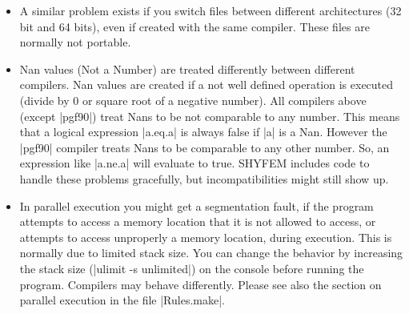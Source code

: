 \begin{itemize}
\item A similar problem exists if you switch files between different
architectures (32 bit and 64 bits), even if created with the same
compiler. These files are normally not portable.

\item Nan values (Not a Number) are treated differently between different
compilers. Nan values are created if a not well defined operation is
executed (divide by 0 or square root of a negative number). All compilers
above (except |pgf90|) treat Nans to be not comparable to any number.
This means that a logical expression |a.eq.a| is always false if |a|
is a Nan. However the |pgf90| compiler treats Nans to be comparable
to any other number. So, an expression like |a.ne.a| will evaluate to
true. SHYFEM includes code to handle these problems gracefully, but
incompatibilities might still show up.

\item In parallel execution you might get a segmentation fault, 
if the program attempts to access a memory location that it is not allowed to access, 
or attempts to access unproperly a memory location, during
execution. This is normally due to limited stack size. You can change
the behavior by increasing the stack size (|ulimit -s unlimited|)
on the console before running the program. Compilers may behave
differently. Please see also the section on parallel execution in the
file |Rules.make|.

\end{itemize}






